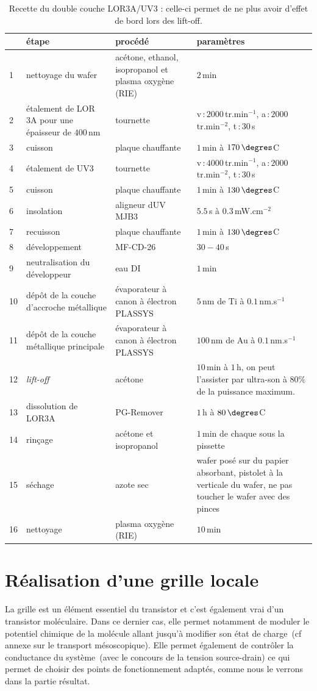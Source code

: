 \begin{table}
\begin{center}
\begin{tabular}{|p{0.5cm}|p{4cm}|p{4cm}|p{3cm}|}
  \hline
\,& \textbf{étape} & \textbf{procédé} & \textbf{paramètres} \tabularnewline
\hline
1 &  nettoyage du wafer & acétone, ethanol, isopropanol et plasma oxygène (RIE)& $2\,$min \tabularnewline
\hline
 2 & étalement de LOR 3A pour une épaisseur de $400\,$nm& tournette & v\,:\,$2000\,$tr.min$^{-1}$, a\,:\,$2000\,$tr.min$^{-2}$, t\,:\,$30\,$s \tabularnewline
\hline
 3 & cuisson & plaque chauffante & $1\,$min à $170\,\degres$C \tabularnewline
\hline
4 & étalement de UV3 & tournette & v\,:\,$4000\,$tr.min$^{-1}$, a\,:\,$2000\,$tr.min$^{-2}$, t\,:\,$30\,$s \tabularnewline
\hline
5 & cuisson & plaque chauffante & $1\,$min à $130\,\degres$C \tabularnewline
\hline
6 & insolation & aligneur dUV MJB3 & $5.5\,$s à $0.3\,$mW.cm$^{-2}$\tabularnewline
\hline
7 & recuisson & plaque chauffante & $1\,$min à $130\,\degres$C \tabularnewline
\hline
8 & développement & MF-CD-26 & $30-40\,$s\tabularnewline
\hline
9 & neutralisation du développeur & eau DI & $1\,$min\tabularnewline
\hline
10 & dépôt de la couche d'accroche métallique & évaporateur à canon à électron PLASSYS & $5\,$nm de Ti à $0.1\,$nm.s$^{-1}$ \tabularnewline
\hline
11 & dépôt de la couche métallique principale & évaporateur à canon à électron PLASSYS & $100\,$nm de Au à $0.1\,$nm.s$^{-1}$ \tabularnewline
\hline
12 & \textit{lift-off} & acétone & $10\,$min à $1\,$h, on peut l'assister par ultra-son à $80\%$ de la puissance maximum. \tabularnewline
\hline
 13 & dissolution de LOR3A & PG-Remover & $1\,$h à $80\,\degres$C \tabularnewline
\hline
14 & rinçage & acétone et isopropanol & $1\,$min de chaque sous la pissette\tabularnewline
\hline
15 & séchage & azote sec & wafer posé sur du papier absorbant, pistolet à la verticale du wafer, ne pas toucher le wafer avec des pinces\tabularnewline
\hline
16 & nettoyage & plasma oxygène (RIE)& $10\,$min\tabularnewline
\hline
\end{tabular}
\caption{Recette du double couche LOR3A/UV3 : celle-ci permet de ne plus avoir d'effet de bord lors des lift-off.}
\label{tab_recette}
\end{center}
\end{table}






\section{Réalisation d'une grille locale}
La grille est un élément essentiel du transistor et c'est également vrai d'un transistor moléculaire. Dans ce dernier cas, elle permet notamment de moduler le potentiel chimique de la molécule allant jusqu'à modifier son état de charge~(cf annexe sur le transport mésoscopique). Elle permet également de contrôler la conductance du système~(avec le concours de la tension source-drain) ce qui permet de choisir des points de fonctionnement adaptés, comme nous le verrons dans la partie résultat. 

